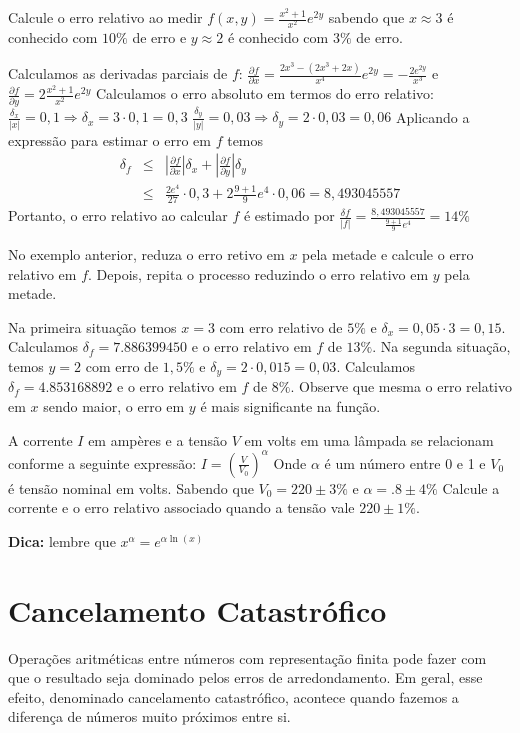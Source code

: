 \begin{ex} Calcule o erro relativo ao medir $f(x,y)=\frac{x^2+1}{x^2}e^{2y}$ sabendo que $x\approx 3$ é conhecido com $10\%$ de erro e $y\approx 2$ é conhecido com $3\%$ de erro.

Calculamos as derivadas parciais de $f$:
$
\frac{\partial f}{\partial x}=\frac{2x^3-(2x^3+2x)}{x^4}e^{2y}=-\frac{2e^{2y}}{x^3}
$
e
$
\frac{\partial f}{\partial y}=2\frac{x^2+1}{x^2}e^{2y}
$
Calculamos o erro absoluto em termos do erro relativo:
$
\frac{\delta_x}{|x|}=0,1\Rightarrow \delta_x= 3\cdot 0,1=0,3
$
$
\frac{\delta_y}{|y|}=0,03\Rightarrow \delta_y= 2\cdot 0,03=0,06
$
Aplicando a expressão para estimar o erro em $f$ temos
\begin{eqnarray*}
\delta_f &\leq& \left|\frac{\partial f}{\partial x}\right|\delta_x+\left|\frac{\partial f}{\partial y}\right|\delta_y\\
&\leq& \frac{2e^{4}}{27}\cdot 0,3+2\frac{9+1}{9}e^{4}\cdot 0,06=8,493045557
\end{eqnarray*}
Portanto, o erro relativo ao calcular $f$ é estimado por
$
\frac{\delta f}{|f|}=\frac{8,493045557}{\frac{9+1}{9}e^{4}}=14\%
$
\end{ex}
\begin{ex} No exemplo anterior, reduza o erro retivo em $x$ pela metade e calcule o erro relativo em $f$. Depois, repita o processo reduzindo o erro relativo em $y$ pela metade.

Na primeira situação temos $x=3$ com erro relativo de $5\%$ e $\delta_x=0,05\cdot 3=0,15$. Calculamos $\delta_f=7.886399450$ e o erro relativo em $f$ de $13\%$. Na segunda situação, temos $y=2$ com erro de $1,5\%$ e $\delta_y=2\cdot 0,015=0,03$. Calculamos $\delta_f=4.853168892$ e o erro relativo em $f$ de $8\%$. Observe que mesma o erro relativo em $x$ sendo maior, o erro em $y$ é mais significante na função.
\end{ex}

\begin{prob} A corrente $I$ em ampères e a tensão $V$ em volts em uma lâmpada se relacionam conforme a seguinte expressão:
$I=\left(\frac{V}{V_0}\right)^\alpha$
Onde $\alpha$ é um número entre 0 e 1 e $V_0$ é tensão nominal em volts. Sabendo que $V_0=220\pm 3\%$ e $\alpha=.8\pm 4\%$
Calcule a corrente e o erro relativo associado quando a tensão vale $220\pm 1\%$.

{\bf Dica:} lembre que $x^\alpha=e^{\alpha \ln(x)}$
\end{prob}


\section{Cancelamento Catastrófico}
Operações aritméticas entre números com representação finita pode fazer com que o resultado seja dominado pelos erros de arredondamento. Em geral, esse efeito, denominado cancelamento catastrófico, acontece quando fazemos a diferença de números muito próximos entre si.

